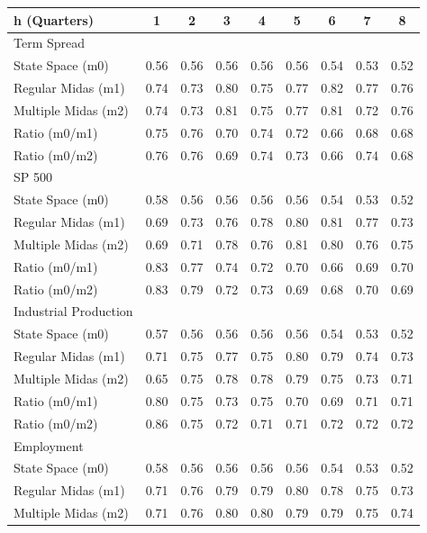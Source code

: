 \begin{table}[ht]
\centering
\small
\begin{tabular}{lcccccccc}
\hline
h (Quarters) & 1 & 2 & 3 & 4 & 5 & 6 & 7 & 8 \\
\hline
\hline
\hline
Term Spread &  &  &  &  &  &  &  &  \\
\hline
State Space (m0) & 0.56 & 0.56 & 0.56 & 0.56 & 0.56 & 0.54 & 0.53 & 0.52 \\
Regular Midas (m1) & 0.74 & 0.73 & 0.80 & 0.75 & 0.77 & 0.82 & 0.77 & 0.76 \\
Multiple Midas (m2) & 0.74 & 0.73 & 0.81 & 0.75 & 0.77 & 0.81 & 0.72 & 0.76 \\
Ratio (m0/m1) & 0.75 & 0.76 & 0.70 & 0.74 & 0.72 & 0.66 & 0.68 & 0.68 \\
Ratio (m0/m2) & 0.76 & 0.76 & 0.69 & 0.74 & 0.73 & 0.66 & 0.74 & 0.68 \\
\hline
SP 500 &  &  &  &  &  &  &  &  \\
\hline
State Space (m0) & 0.58 & 0.56 & 0.56 & 0.56 & 0.56 & 0.54 & 0.53 & 0.52 \\
Regular Midas (m1) & 0.69 & 0.73 & 0.76 & 0.78 & 0.80 & 0.81 & 0.77 & 0.73 \\
Multiple Midas (m2) & 0.69 & 0.71 & 0.78 & 0.76 & 0.81 & 0.80 & 0.76 & 0.75 \\
Ratio (m0/m1) & 0.83 & 0.77 & 0.74 & 0.72 & 0.70 & 0.66 & 0.69 & 0.70 \\
Ratio (m0/m2) & 0.83 & 0.79 & 0.72 & 0.73 & 0.69 & 0.68 & 0.70 & 0.69 \\
\hline
Industrial Production &  &  &  &  &  &  &  &  \\
\hline
State Space (m0) & 0.57 & 0.56 & 0.56 & 0.56 & 0.56 & 0.54 & 0.53 & 0.52 \\
Regular Midas (m1) & 0.71 & 0.75 & 0.77 & 0.75 & 0.80 & 0.79 & 0.74 & 0.73 \\
Multiple Midas (m2) & 0.65 & 0.75 & 0.78 & 0.78 & 0.79 & 0.75 & 0.73 & 0.71 \\
Ratio (m0/m1) & 0.80 & 0.75 & 0.73 & 0.75 & 0.70 & 0.69 & 0.71 & 0.71 \\
Ratio (m0/m2) & 0.86 & 0.75 & 0.72 & 0.71 & 0.71 & 0.72 & 0.72 & 0.72 \\
\hline
Employment &  &  &  &  &  &  &  &  \\
\hline
State Space (m0) & 0.58 & 0.56 & 0.56 & 0.56 & 0.56 & 0.54 & 0.53 & 0.52 \\
Regular Midas (m1) & 0.71 & 0.76 & 0.79 & 0.79 & 0.80 & 0.78 & 0.75 & 0.73 \\
Multiple Midas (m2) & 0.71 & 0.76 & 0.80 & 0.80 & 0.79 & 0.79 & 0.75 & 0.74 \\

\end{tabular}
\end{table}
